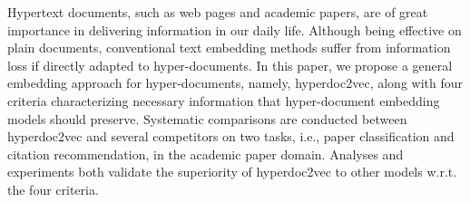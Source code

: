 Hypertext documents, such as web pages and academic papers, are of great importance in delivering information in our daily life. Although being effective on plain documents, conventional text embedding methods suffer from information loss if directly adapted to hyper-documents. In this paper, we propose a general embedding approach for hyper-documents, namely, hyperdoc2vec, along with four criteria characterizing necessary information that hyper-document embedding models should preserve. Systematic comparisons are conducted between hyperdoc2vec and several competitors on two tasks, i.e., paper classification and citation recommendation, in the academic paper domain. Analyses and experiments both validate the superiority of hyperdoc2vec to other models w.r.t. the four criteria.
